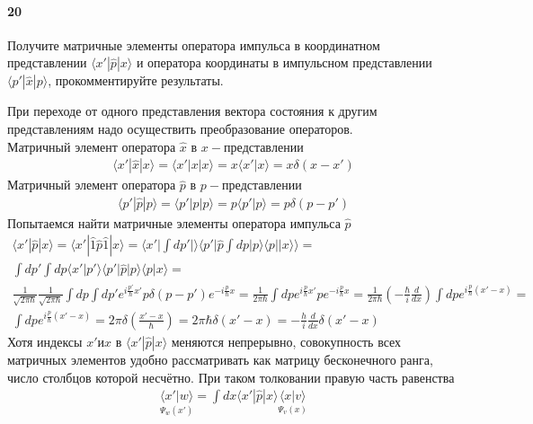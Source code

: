 


	
\paragraph{20}
Получите матричные элементы оператора импульса в координатном представлении $\langle x' | \hat{p} | x\rangle$ и оператора координаты в импульсном представлении $\langle p' | \hat{x} | p \rangle$, прокомментируйте результаты.

При переходе от одного представления вектора состояния к другим представлениям надо осуществить преобразование операторов.\\
Матричный элемент оператора $\widehat{x}$ в $x-представлении$
\begin{gather*}
\langle x'|\widehat{x}|x\rangle = \langle x'|x|x\rangle = x\langle x'|x\rangle = x\delta(x-x')
\end{gather*}
Матричный элемент оператора $\widehat{p}$ в $p-представлении$
\begin{gather*}
\langle p'|\widehat{p}|p\rangle = \langle p'|p|p\rangle = p\langle p'|p\rangle = p\delta(p-p')
\end{gather*}
Попытаемся найти матричные элементы оператора импульса $\widehat{p}$
\begin{gather*}
\langle x'|\widehat{p}|x\rangle = \langle x'|\widehat{1}\widehat{p}\widehat{1}|x\rangle =  \langle x'|\int{dp'|\rangle\langle p'|\widehat{p}\int{dp|p\rangle\langle p||x\rangle}}\rangle =\\ \int{dp'}\int{dp\langle x'|p'\rangle\langle p'|\widehat{p}|p\rangle\langle p|x\rangle} =\\ \frac{1}{\sqrt{2\pi\hbar}}\frac{1}{\sqrt{2\pi\hbar}}\int{dp}\int{dp'}e^{i\frac{p'}{\hbar}x'}p\delta(p - p')e^{-i\frac{p}{\hbar}x} = \frac{1}{2\pi\hbar}\int{dp}e^{i\frac{p}{\hbar}x'}pe^{-i\frac{p}{\hbar}x} = \frac{1}{2\pi\hbar}(-\frac{\hbar}{i}\frac{d}{dx})\int{dpe^{i\frac{p}{\hbar}(x' - x)}} =\\
\int{dpe^{i\frac{p}{\hbar}(x' - x)}} = 2\pi\delta(\frac{x' - x}{\hbar}) = 2\pi\hbar\delta(x'-x) = -\frac{h}{i}\frac{d}{dx}\delta(x' - x)
\end{gather*}
Хотя индексы $x' и x$ в $\langle x'|\widehat{p}|x\rangle$ меняются непрерывно, совокупность всех матричных элементов удобно рассматривать как матрицу бесконечного ранга, число столбцов которой несчётно. При таком толковании правую часть равенства
\begin{gather*}
\underset{\Psi_w(x')}{\langle x'|w\rangle} = \int{dx\langle x'|\widehat{p}|x\rangle\underset{\Psi_v(x)}{\langle x|v\rangle}}
\end{gather*}
